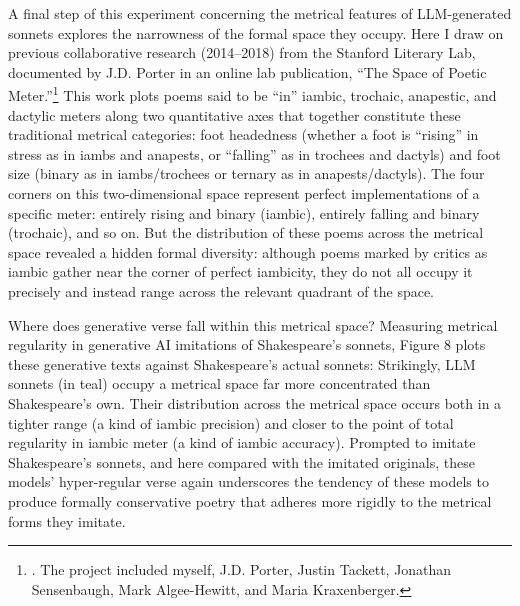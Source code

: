 \documentclass{simple-humanities}         %
\begin{document}
A final step of this experiment concerning the metrical features of LLM-generated sonnets explores the narrowness of the formal space they occupy. Here I draw on previous collaborative research (2014--2018) from the Stanford Literary Lab, documented by J.D. Porter in an online lab publication, ``The Space of Poetic Meter.''\footnote{\textcite{porterSpacePoeticMeter2018a}. The project included myself, J.D. Porter, Justin Tackett, Jonathan Sensenbaugh, Mark Algee-Hewitt, and Maria Kraxenberger.} This work plots poems said to be ``in'' iambic, trochaic, anapestic, and dactylic meters along two quantitative axes that together constitute these traditional metrical categories: foot headedness (whether a foot is ``rising'' in stress as in iambs and anapests, or ``falling'' as in trochees and dactyls) and foot size (binary as in iambs/trochees or ternary as in anapests/dactyls). The four corners on this two-dimensional space represent perfect implementations of a specific meter: entirely rising and binary (iambic), entirely falling and binary (trochaic), and so on. But the distribution of these poems across the metrical space revealed a hidden formal diversity: although poems marked by critics as iambic gather near the corner of perfect iambicity, they do not all occupy it precisely and instead range across the relevant quadrant of the space.

Where does generative verse fall within this metrical space? Measuring metrical regularity in generative AI imitations of Shakespeare's sonnets, Figure 8 plots these generative texts against Shakespeare's actual sonnets:
Strikingly, LLM sonnets (in teal) occupy a metrical space far more concentrated than Shakespeare's own. Their distribution across the metrical space occurs both in a tighter range (a kind of iambic precision) and closer to the point of total regularity in iambic meter (a kind of iambic accuracy). Prompted to imitate Shakespeare's sonnets, and here compared with the imitated originals, these models' hyper-regular verse again underscores the tendency of these models to produce formally conservative poetry that adheres more rigidly to the metrical forms they imitate.
\end{document}
